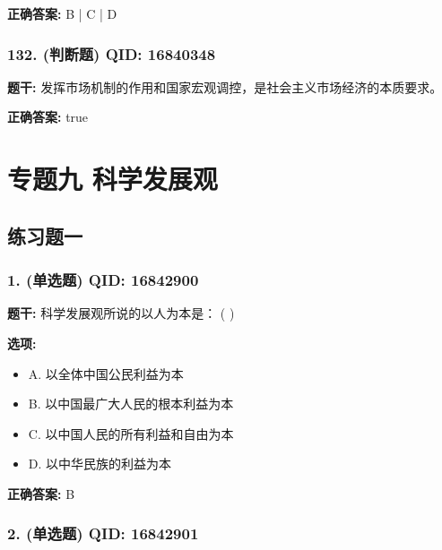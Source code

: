 \documentclass[12pt,UTF8]{ctexart}
\begin{document}
\textbf{正确答案:}
B | C | D

\vspace{0.3em}\hrulefill\vspace{0.7em}

\subsubsection*{132. (判断题) \small QID: 16840348}

\textbf{题干:}
发挥市场机制的作用和国家宏观调控，是社会主义市场经济的本质要求。

\textbf{正确答案:}
true

\vspace{0.3em}\hrulefill\vspace{0.7em}

\section*{专题九  科学发展观}
\hrulefill

\subsection*{练习题一}

\subsubsection*{1. (单选题) \small QID: 16842900}

\textbf{题干:}
科学发展观所说的以人为本是： ( )

\textbf{选项:}
\begin{itemize}[leftmargin=*]

  \item A. 以全体中国公民利益为本

  \item B. 以中国最广大人民的根本利益为本

  \item C. 以中国人民的所有利益和自由为本

  \item D. 以中华民族的利益为本

\end{itemize}

\textbf{正确答案:}
B

\vspace{0.3em}\hrulefill\vspace{0.7em}

\subsubsection*{2. (单选题) \small QID: 16842901}
\end{document}
